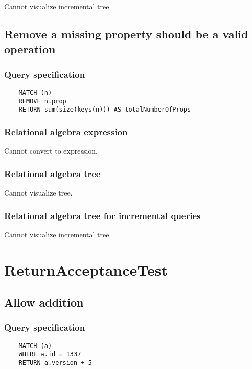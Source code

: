 	Cannot visualize incremental tree.
	\subsection{Remove a missing property should be a valid operation}

	\subsubsection*{Query specification}

	\begin{lstlisting}
	MATCH (n)
	REMOVE n.prop
	RETURN sum(size(keys(n))) AS totalNumberOfProps
	\end{lstlisting}


	\subsubsection*{Relational algebra expression}

	Cannot convert to expression.

	\subsubsection*{Relational algebra tree}

	Cannot visualize tree.

	\subsubsection*{Relational algebra tree for incremental queries}

	Cannot visualize incremental tree.

	\section{ReturnAcceptanceTest}

	\subsection{Allow addition}

	\subsubsection*{Query specification}

	\begin{lstlisting}
	MATCH (a)
	WHERE a.id = 1337
	RETURN a.version + 5
	\end{lstlisting}


